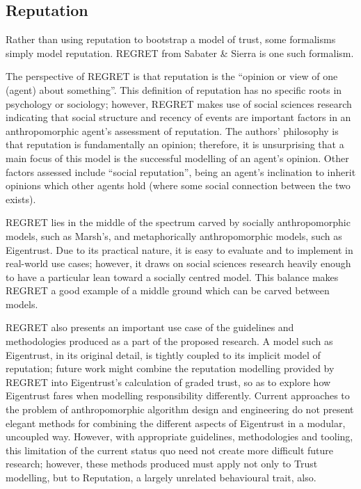 \subsection{Reputation}
Rather than using reputation to bootstrap a model of trust, some formalisms simply model reputation. REGRET\cite{Sabater} from Sabater \& Sierra is one such formalism.\par

The perspective of REGRET is that reputation is the ``opinion or view of one (agent) about something''\cite{Sabater}. This definition of reputation has no specific roots in psychology or sociology; however, REGRET makes use of social sciences research indicating that social structure and recency of events are important factors in an anthropomorphic agent's assessment of reputation. The authors' philosophy is that reputation is fundamentally an opinion; therefore, it is unsurprising that a main focus of this model is the successful modelling of an agent's opinion. Other factors assessed include ``social reputation'', being an agent's inclination to inherit opinions which other agents hold (where some social connection between the two exists).\par

REGRET lies in the middle of the spectrum carved by socially anthropomorphic models, such as Marsh's, and metaphorically anthropomorphic models, such as Eigentrust. Due to its practical nature, it is easy to evaluate and to implement in real-world use cases; however, it draws on social sciences research heavily enough to have a particular lean toward a socially centred model. This balance makes REGRET a good example of a middle ground which can be carved between models.\par

REGRET also presents an important use case of the guidelines and methodologies produced as a part of the proposed research. A model such as Eigentrust, in its original detail, is tightly coupled to its implicit model of reputation; future work might combine the reputation modelling provided by REGRET into Eigentrust's calculation of graded trust, so as to explore how Eigentrust fares when modelling responsibility differently. Current approaches to the problem of anthropomorphic algorithm design and engineering do not present elegant methods for combining the different aspects of Eigentrust in a modular, uncoupled way. However, with appropriate guidelines, methodologies and tooling, this limitation of the current status quo need not create more difficult future research; however, these methods produced must apply not only to Trust modelling, but to Reputation, a largely unrelated behavioural trait, also.\par

